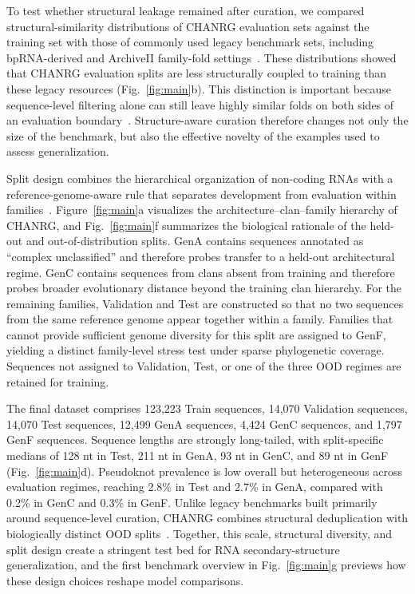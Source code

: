\documentclass[pdflatex,sn-mathphys-num]{sn-jnl}%
\theoremstyle{thmstyleone}%
\theoremstyle{thmstyletwo}%
\theoremstyle{thmstylethree}%
\begin{document}
To test whether structural leakage remained after curation, we compared structural-similarity distributions of CHANRG evaluation sets against the training set with those of commonly used legacy benchmark sets, including bpRNA-derived and ArchiveII family-fold settings~\cite{danaee2018bprna,sloma2016exact,singh2019rna,qiu2023sequence}.
These distributions showed that CHANRG evaluation splits are less structurally coupled to training than these legacy resources (Fig.~\ref{fig:main}b).
This distinction is important because sequence-level filtering alone can still leave highly similar folds on both sides of an evaluation boundary~\cite{qiu2023sequence,lasher2025bprna}.
Structure-aware curation therefore changes not only the size of the benchmark, but also the effective novelty of the examples used to assess generalization.

Split design combines the hierarchical organization of non-coding RNAs with a reference-genome-aware rule that separates development from evaluation within families~\cite{kalvari2021rfam,ontiveros2025rfam}.
Figure~\ref{fig:main}a visualizes the architecture--clan--family hierarchy of CHANRG, and Fig.~\ref{fig:main}f summarizes the biological rationale of the held-out and out-of-distribution splits.
GenA contains sequences annotated as ``complex unclassified'' and therefore probes transfer to a held-out architectural regime.
GenC contains sequences from clans absent from training and therefore probes broader evolutionary distance beyond the training clan hierarchy.
For the remaining families, Validation and Test are constructed so that no two sequences from the same reference genome appear together within a family.
Families that cannot provide sufficient genome diversity for this split are assigned to GenF, yielding a distinct family-level stress test under sparse phylogenetic coverage.
Sequences not assigned to Validation, Test, or one of the three OOD regimes are retained for training.

The final dataset comprises 123{,}223 Train sequences, 14{,}070 Validation sequences, 14{,}070 Test sequences, 12{,}499 GenA sequences, 4{,}424 GenC sequences, and 1{,}797 GenF sequences.
Sequence lengths are strongly long-tailed, with split-specific medians of 128 nt in Test, 211 nt in GenA, 93 nt in GenC, and 89 nt in GenF (Fig.~\ref{fig:main}d).
Pseudoknot prevalence is low overall but heterogeneous across evaluation regimes, reaching 2.8\% in Test and 2.7\% in GenA, compared with 0.2\% in GenC and 0.3\% in GenF.
Unlike legacy benchmarks built primarily around sequence-level curation, CHANRG combines structural deduplication with biologically distinct OOD splits~\cite{danaee2018bprna,qiu2023sequence,lasher2025bprna}.
Together, this scale, structural diversity, and split design create a stringent test bed for RNA secondary-structure generalization, and the first benchmark overview in Fig.~\ref{fig:main}g previews how these design choices reshape model comparisons.
\end{document}
